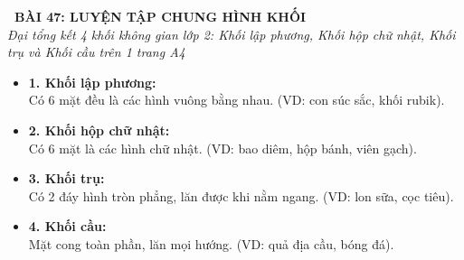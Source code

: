 \documentclass[11pt,a4paper]{article}
\begin{document}
\begin{tcolorbox}[
  enhanced,
  colback=violet!8!white,
  colframe=violet!70!black,
  arc=3mm, boxrule=1.2pt,
  left=3mm, right=3mm, top=2mm, bottom=2mm,
  halign=center
]
  {\LARGE\bfseries\color{violet!90!black}\faBookmark\ BÀI 47: LUYỆN TẬP CHUNG HÌNH KHỐI}\\[1mm]
  {\itshape\footnotesize\color{black!75} Đại tổng kết 4 khối không gian lớp 2: Khối lập phương, Khối hộp chữ nhật, Khối trụ và Khối cầu trên 1 trang A4}
\end{tcolorbox}

\vspace{-2mm}

\noindent
\begin{minipage}[t]{0.49\textwidth}\vspace{0pt}
\begin{tcolorbox}[
  enhanced,
  colback=violet!4!white,
  colframe=violet!75!black,
  arc=2mm, boxrule=0.8pt,
  left=2mm, right=2mm, top=1.8mm, bottom=1.8mm,
  title={\footnotesize\bfseries\color{white}\faKey\ 1. Bộ tứ hình khối lớp 2}
]
{\footnotesize
\begin{itemize}\setlength{\itemsep}{1pt}\setlength{\leftskip}{-2.5mm}
  \item \textbf{1. Khối lập phương:}\\
  Có $6$ mặt đều là các hình vuông bằng nhau. (VD: con súc sắc, khối rubik).
  \item \textbf{2. Khối hộp chữ nhật:}\\
  Có $6$ mặt là các hình chữ nhật. (VD: bao diêm, hộp bánh, viên gạch).
  \item \textbf{3. Khối trụ:}\\
  Có 2 đáy hình tròn phẳng, lăn được khi nằm ngang. (VD: lon sữa, cọc tiêu).
  \item \textbf{4. Khối cầu:}\\
  Mặt cong toàn phần, lăn mọi hướng. (VD: quả địa cầu, bóng đá).
\end{itemize}
}
\end{tcolorbox}
\end{minipage}
\hfill
\end{document}
